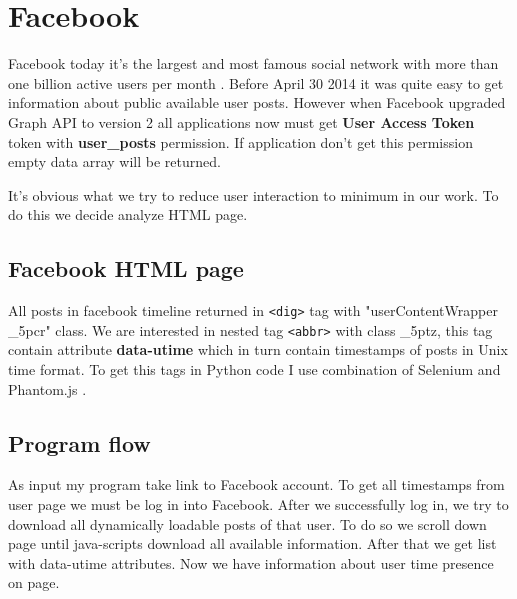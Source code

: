 \section{Facebook}
Facebook today it's the largest and most famous social network with more than one billion active users per month \cite{facebookStats}. Before April 30 2014 it was quite easy to get information about public available user posts. However when Facebook upgraded  Graph API to version 2 all applications now must get \textbf{User Access Token} token with \textbf{user\_posts} permission. If application don't get this permission empty data array will be returned. \par It's obvious what we try to reduce user interaction to minimum in our work. To do this we decide analyze HTML page.
\subsection{Facebook HTML page}
 All posts in facebook timeline returned in \texttt{<dig>} tag with "userContentWrapper \_5pcr" class. We are interested in nested tag \texttt{<abbr>} with class \_5ptz, this tag contain attribute \textbf{data-utime} which in turn contain timestamps of posts in Unix time format.
 To get this tags in Python code I use combination of Selenium \cite{Selenium} and Phantom.js \cite{Phantomjs}.
 \subsection{Program flow}
 As input my program take link to Facebook account. To get all timestamps from user page we must be log in into Facebook. After we successfully log in, we try to download all dynamically loadable posts of that user. To do so we scroll down page until java-scripts download all available information. After that we get list with data-utime attributes. Now we have information about user time presence on page.
